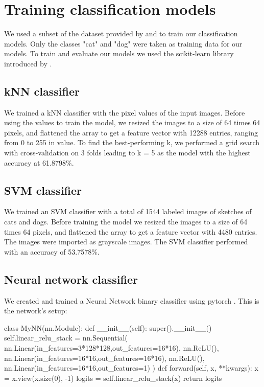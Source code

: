 \section*{Training classification models}
We used a subset of the dataset provided by \textcite{eitz2012hdhso} and
\textcite{10.1145/2897824.2925954} to train our classification models.
Only the classes "cat" and "dog" were taken as training data for our models. 
To train and evaluate our models we used the scikit-learn library introduced by
\textcite{scikit-learn}.

\subsection*{kNN classifier}
We trained a kNN classifier with the pixel values of the input images. Before
using the values to train the model, we resized the images to a size of 64 times 
64 pixels, and flattened the array to get a feature vector with 12288 entries, 
ranging from 0 to 255 in value. To find the best-performing k, we performed a
grid search with cross-validation on 3 folds leading to k = 5 as the model with 
the highest accuracy at 61.8798\%.

\subsection*{SVM classifier}
We trained an SVM classifier with a total of 1544 labeled images of sketches of
cats and dogs. Before training the model we resized the images to a size of 64
times 64 pixels, and flattened the array to get a feature vector with 4480
entries. The images were imported as grayscale images. The SVM classifier
performed with an accuracy of 53.7578\%.


\subsection*{Neural network classifier}
We created and trained a Neural Network binary classifier using pytorch
\textcite{pytorch}. This is the network's setup:

\begin{python}
    class MyNN(nn.Module):
    def __init__(self):
        super().__init__()
        self.linear_relu_stack = nn.Sequential(
            nn.Linear(in_features=3*128*128,out_features=16*16),
            nn.ReLU(),
            nn.Linear(in_features=16*16,out_features=16*16),
            nn.ReLU(),
            nn.Linear(in_features=16*16,out_features=1)
        )
    def forward(self, x, **kwargs):
        x = x.view(x.size(0), -1)
        logits = self.linear_relu_stack(x)
        return logits
\end{python}


